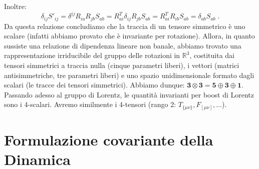 Inoltre:
\begin{equation}
\delta_{ij}S'_{ij} = \delta^{ij}R_{ia}R_{jb}S_{ab}=R_{ai}^T\delta_{ij}R_{jb}S_{ab}=R_{ai}^TR_{ib}S_{ab}=\delta_{ab}S_{ab}\;.
\end{equation}
Da questa relazione concludiamo che la traccia di un tensore simmetrico è uno scalare (infatti abbiamo provato che è invariante per 
rotazione). Allora, in quanto sussiste una relazione di dipendenza lineare non banale, abbiamo trovato una rappresentazione irriducibile
del gruppo delle rotazioni in $\mathbb{R}^3$, costituita dai tensori simmetrici a traccia nulla (cinque parametri liberi), i vettori (matrici 
antisimmetriche, tre parametri liberi) e uno spazio unidimensionale formato dagli scalari (le tracce dei tensori simmetrici). Abbiamo
 dunque: $\mathbf{3}\otimes\mathbf{3}=\mathbf{5}\oplus\mathbf{3}\oplus\mathbf{1}$. Passando adesso al gruppo di Lorentz, le quantità invarianti per boost di Lorentz sono i 4-scalari. Avremo similmente i 4-tensori (rango 2: $T_{\{\mu\nu\}},F_{[\mu\nu]},\ldots$).
\section{Formulazione covariante della Dinamica}
